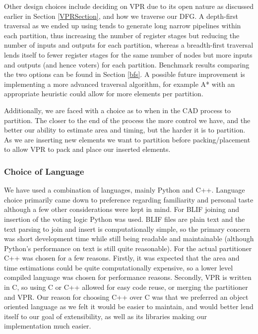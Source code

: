 \documentclass[12pt,final,oneside,a4paper]{dwThesis} %
\begin{document}
   Other design choices include deciding on \gls{VPR} due to its open nature as
   discussed earlier in Section \ref{VPRSection}, and how we traverse our
   \gls{DFG}. A depth-first traversal as we ended up using tends to generate
   long narrow pipelines within each partition, thus increasing the number of
   register stages but reducing the number of inputs and outputs for each
   partition, whereas a breadth-first traversal lends itself to fewer register
   stages for the same number of nodes but more inputs and outputs (and hence
   voters) for each partition. Benchmark results
   comparing the two options can be found in Section \ref{bfs}.
    A possible future improvement is implementing a
   more advanced traversal algorithm, for example A* with an appropriate
   heuristic could allow for more elements per partition.

   Additionally, we are faced with a choice as to when in the \gls{CAD} process
   to partition. The closer to the end of the process the more control we have,
   and the better our ability to estimate area and timing, but the harder it is
   to partition. As we are inserting new elements we want to partition before
   packing/placement to allow \gls{VPR} to pack and place our inserted
   elements.

   \subsubsection{Choice of Language} We have used a combination of languages,
   mainly Python and C++. Language choice primarily came down to preference
   regarding familiarity and personal taste although a few other considerations
   were kept in mind.  For \gls{BLIF} joining and insertion of the voting logic
   Python was used. \gls{BLIF} files are plain text and the text parsing to
   join and insert is computationally simple, so the primary concern was short
   development time while still being readable and maintainable (although
   Python's performance on text is still quite
   reasonable)\cite{LanguageBenchmark}.  For the actual partitioner C++ was
   chosen for a few reasons. Firstly, it was expected that the area and time
   estimations could be quite computationally expensive, so a lower level
   compiled language was chosen for performance
   reasons\cite{LanguageBenchmark}. Secondly, \gls{VPR} is written in C, so
   using C or C++ allowed for easy code reuse, or merging the partitioner and
   \gls{VPR}. Our reason for choosing C++ over C was that we preferred an
   object oriented language as we felt it would be easier to maintain, and
   would better lend itself to our goal of extensibility, as well as its
   libraries making our implementation much easier.
\end{document}
